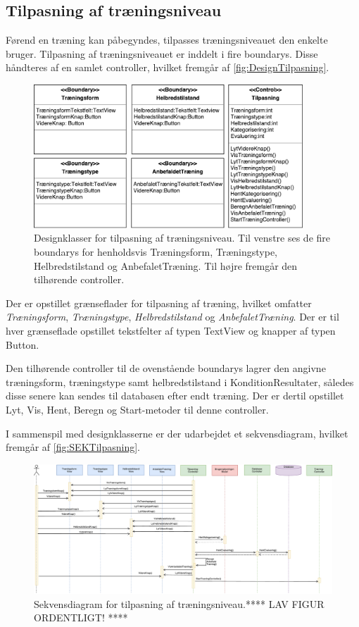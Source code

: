 \subsection*{Tilpasning af træningsniveau}
Førend en træning kan påbegyndes, tilpasses træningsniveauet den enkelte bruger. Tilpasning af træningsniveauet er inddelt i fire boundarys. Disse håndteres af en samlet controller, hvilket fremgår af \autoref{fig:DesignTilpasning}.

\begin{figure} [H]
\centering
\includegraphics[width=0.9\textwidth]{figures/MVC/MVCTilpasning}
\caption{Designklasser for tilpasning af træningsniveau. Til venstre ses de fire boundarys for henholdsvis Træningsform, Træningstype, Helbredstilstand og AnbefaletTræning. Til højre fremgår den tilhørende controller.}
\label{fig:DesignTilpasning}
\end{figure}

\noindent
Der er opstillet grænseflader for tilpasning af træning, hvilket omfatter \textit{Træningsform}, \textit{Træningstype}, \textit{Helbredstilstand} og \textit{AnbefaletTræning}. Der er til hver grænseflade opstillet tekstfelter af typen TextView og knapper af typen Button.   

Den tilhørende controller til de ovenstående boundarys lagrer den angivne træningsform, træningstype samt helbredstilstand  i KonditionResultater, således disse senere kan sendes til databasen efter endt træning. Der er dertil opstillet Lyt, Vis, Hent, Beregn og Start-metoder til denne controller. 

I sammenspil med designklasserne er der udarbejdet et sekvensdiagram, hvilket fremgår af \autoref{fig:SEKTilpasning}. 

\begin{figure} [H]
\centering
\includegraphics[width=1.55\textwidth, angle=90]{figures/Sek/SEKTilpasning}
\caption{Sekvensdiagram for tilpasning af træningsniveau.**** LAV FIGUR ORDENTLIGT! ****}
\label{fig:SEKTilpasning}
\end{figure}

